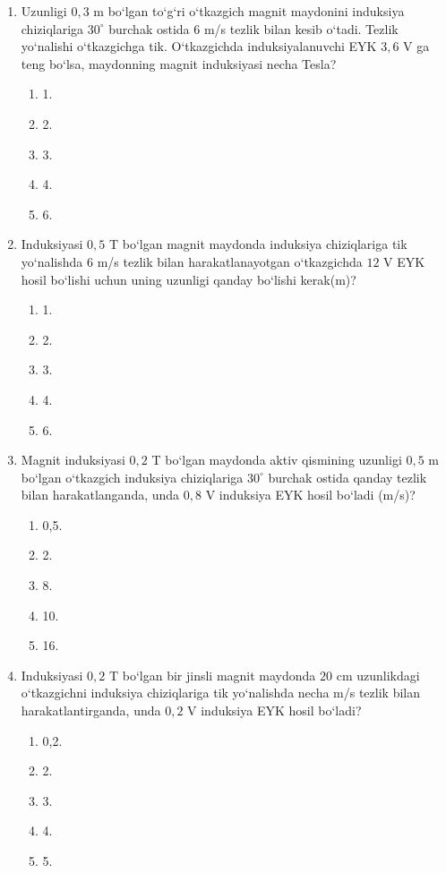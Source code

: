 \begin{enumerate}
\item Uzunligi $0,3$ m bo‘lgan to‘g‘ri o‘tkazgich magnit maydonini induksiya chiziqlariga $30^\circ$ burchak ostida $6$ m/s tezlik bilan kesib o‘tadi. Tezlik yo‘nalishi o‘tkazgichga tik. O‘tkazgichda induksiyalanuvchi EYK $3,6$ V ga teng bo‘lsa, maydonning magnit induksiyasi necha Tesla?
\begin{enumerate}[label=\Alph*)]
\item 1.
\item 2.
\item 3.
\item 4.
\item 6.
\end{enumerate}

\item Induksiyasi $0,5$ T bo‘lgan magnit maydonda induksiya chiziqlariga tik yo‘nalishda $6$ m/s tezlik bilan harakatlanayotgan o‘tkazgichda $12$ V EYK hosil bo‘lishi uchun uning uzunligi qanday bo‘lishi kerak(m)?
\begin{enumerate}[label=\Alph*)]
\item 1.
\item 2.
\item 3.
\item 4.
\item 6.
\end{enumerate}

\item Magnit induksiyasi $0,2$ T bo‘lgan maydonda aktiv qismining uzunligi $0,5$ m bo‘lgan o‘tkazgich induksiya chiziqlariga $30^\circ$ burchak ostida qanday tezlik bilan harakatlanganda, unda $0,8$ V induksiya EYK hosil bo‘ladi (m/s)?
\begin{enumerate}[label=\Alph*)]
\item 0,5.
\item 2.
\item 8.
\item 10.
\item 16.
\end{enumerate}

\item Induksiyasi $0,2$ T bo‘lgan bir jinsli magnit maydonda $20$ cm uzunlikdagi o‘tkazgichni induksiya chiziqlariga tik yo‘nalishda necha m/s tezlik bilan harakatlantirganda, unda $0,2$ V induksiya EYK hosil bo‘ladi?
\begin{enumerate}[label=\Alph*)]
\item 0,2.
\item 2.
\item 3.
\item 4.
\item 5.
\end{enumerate}


\end{enumerate}
